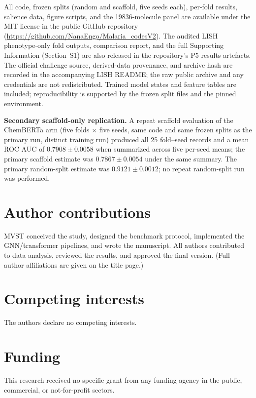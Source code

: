 \documentclass[11pt,a4paper]{article}
\begin{document}
All code, frozen splits (random and scaffold, five seeds each), per-fold results, salience data, figure scripts, and the \num{19836}-molecule panel are available under the MIT license in the public GitHub repository (\url{https://github.com/NanaEngo/Malaria_codesV2}). The audited LISH phenotype-only fold outputs, comparison report, and the full Supporting Information (Section~S1) are also released in the repository's P5 results artefacts. The official challenge source, derived-data provenance, and archive hash are recorded in the accompanying LISH README; the raw public archive and any credentials are not redistributed. Trained model states and feature tables are included; reproducibility is supported by the frozen split files and the pinned environment.

\noindent\textbf{Secondary scaffold-only replication.} A repeat scaffold evaluation of the ChemBERTa arm (five folds $\times$ five seeds, same code and same frozen splits as the primary run, distinct training run) produced all \num{25} fold--seed records and a mean ROC AUC of $\num{0.7908} \pm \num{0.0058}$ when summarized across five per-seed means; the primary scaffold estimate was $\num{0.7867} \pm \num{0.0054}$ under the same summary. The primary random-split estimate was $\num{0.9121} \pm \num{0.0012}$; no repeat random-split run was performed.

\section*{Author contributions}

MVST conceived the study, designed the benchmark protocol, implemented the GNN/transformer pipelines, and wrote the manuscript. All authors contributed to data analysis, reviewed the results, and approved the final version. (Full author affiliations are given on the title page.)

\section*{Competing interests}

The authors declare no competing interests.

\section*{Funding}

This research received no specific grant from any funding agency in the public, commercial, or not-for-profit sectors.
\end{document}
